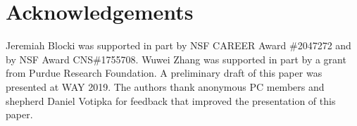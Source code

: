 \vspace*{-\baselineskip}
\vspace*{-\baselineskip}
\section{Acknowledgements}
\vspace*{-\baselineskip}
Jeremiah Blocki was supported in part by NSF CAREER Award \#2047272 and by NSF Award CNS\#1755708. Wuwei Zhang was supported in part by a grant from Purdue Research Foundation. A preliminary draft of this paper was presented at WAY 2019. The authors thank anonymous PC members and shepherd Daniel Votipka for feedback that improved the presentation of this paper. 